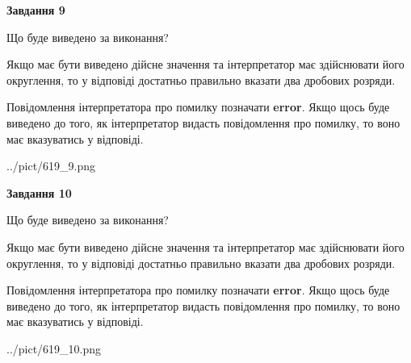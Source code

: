 \documentclass[12pt, ukrainian]{article}
\begin{document}
{\begin {Large}
{\begin {center}\textbf{Завдання 9}\end {center}}\par
Що буде виведено за виконання? \par

Якщо має бути виведено дійсне значення та інтерпретатор має здійснювати його округлення, 
то у відповіді достатньо правильно вказати два дробових розряди.

Повідомлення інтерпретатора про помилку позначати \textbf{error}.
Якщо щось буде виведено до того, як інтерпретатор видасть повідомлення про помилку, 
то воно має вказуватись у відповіді. \par

\begin{center}
	{../pict/619_9.png}
\end{center}
\newpage

{\begin {center}\textbf{Завдання 10}\end {center}}\par
Що буде виведено за виконання? \par

Якщо має бути виведено дійсне значення та інтерпретатор має здійснювати його округлення, 
то у відповіді достатньо правильно вказати два дробових розряди.

Повідомлення інтерпретатора про помилку позначати \textbf{error}.
Якщо щось буде виведено до того, як інтерпретатор видасть повідомлення про помилку, 
то воно має вказуватись у відповіді. \par

\begin{center}
	{../pict/619_10.png}
\end{center}
\newpage

\end {Large}}
\end{document}
